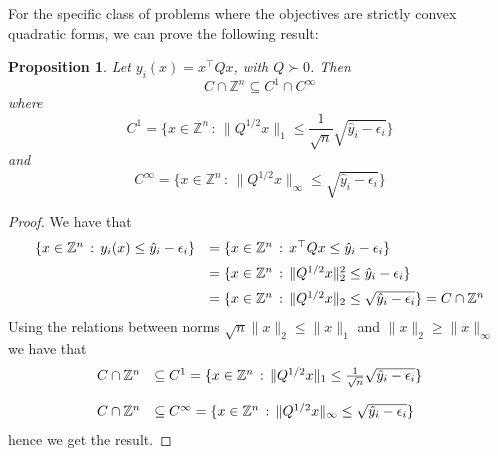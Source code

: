 \documentclass[preprint,12pt]{elsarticle}
\newtheorem{proposition}[theorem]{Proposition}
\def\Z{\mathbb{Z}}
\begin{document}
For the specific class of problems where the objectives are strictly convex quadratic forms,
we can prove the following result:
\begin{proposition}\label{prop:lincuts}
 Let $y_i(x) = x^\top Q x$, with $Q\succ 0$.
 Then
   \[C\cap \Z^n \subseteq C^1\cap C^\infty\]
  where
    \[C^1 = \Big\{x\in \Z^n\,:\, \|Q^{1/2} x\|_1 \leq \frac 1  {\sqrt{n}}\sqrt{\hat y_i - \epsilon_i} \Big\} \]
and
   \[C^\infty = \Big\{x\in \Z^n\,:\, \|Q^{1/2} x\|_\infty \leq \sqrt{\hat y_i - \epsilon_i} \Big\} \]

\end{proposition}

\begin{proof}
We have that
 \begin{equation*}\label{eq:2norm}
 \begin{array}{l l}
  \{x\in \Z^n\,:\, y_i(x)\leq \hat y_i - \epsilon_i \} &= \{x\in \Z^n\,:\, x^\top Q x \leq \hat y_i - \epsilon_i \} \\ [1.3ex]
  &= \{x\in \Z^n\,:\, \|Q^{1/2} x\|_2^2 \leq \hat y_i - \epsilon_i \} \\[1.3ex]
  &= \{x\in \Z^n\,:\, \|Q^{1/2} x\|_2 \leq \sqrt{\hat y_i - \epsilon_i} \}=C\cap \Z^n
 \end{array}
\end{equation*}
Using the relations between   norms  $ {\sqrt{n}}\|x\|_2 \leq  \|x\|_1$ and $ \|x\|_2 \geq  \|x\|_\infty$ we have that
$$\begin{array}{l l}
C\cap \Z^n
  &\subseteq C^1=\{x\in \Z^n\,:\, \|Q^{1/2} x\|_1 \leq \frac 1  {\sqrt{n}} \sqrt{\hat y_i - \epsilon_i}\}\\[1.3em]
C\cap \Z^n
  &\subseteq C^\infty=\{x\in \Z^n\,:\, \|Q^{1/2} x\|_\infty \leq  \sqrt{\hat y_i - \epsilon_i}\}
\end{array}
$$
hence we get the result.\end{proof}
\end{document}
